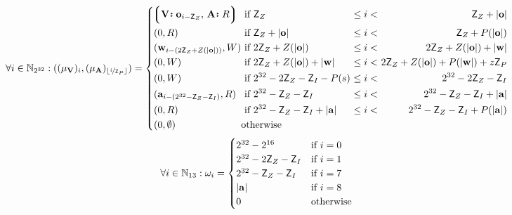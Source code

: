 \begin{equation}\label{eq:memlayout}
  \forall i \in \N_{2^{32}} : ((\mem_\mathbf{V})_i, (\mem_\mathbf{A})_{\floor{\nicefrac{i}{\mathsf{Z}_P}}}) = \left\{\begin{alignedat}{5}
    &\tup{\is{\mathbf{V}}{\mathbf{o}_{i - \mathsf{Z}_Z}}\ts\is{\mathbf{A}}{R}} &&\ \when
        \mathsf{Z}_Z
            &\ \leq i < \ &&
                \mathsf{Z}_Z + |\mathbf{o}|\\
    &(0, R) &&\ \when
        \mathsf{Z}_Z + |\mathbf{o}|
            &\ \leq i < \ &&
                \mathsf{Z}_Z + \rnp{|\mathbf{o}|} \\
    &(\mathbf{w}_{i - (2\mathsf{Z}_Z + \rnq{|\mathbf{o}|})}, W) &&\ \when
        2\mathsf{Z}_Z + \rnq{|\mathbf{o}|}
            &\ \leq i < \ &&
                2\mathsf{Z}_Z + \rnq{|\mathbf{o}|} + |\mathbf{w}|\\
    &(0, W) &&\ \when
        2\mathsf{Z}_Z + \rnq{|\mathbf{o}|} + |\mathbf{w}|
            &\ \leq i < \ &&
                2\mathsf{Z}_Z + \rnq{|\mathbf{o}|} + \rnp{|\mathbf{w}|} + z\mathsf{Z}_P\\
    &(0, W) &&\ \when
        2^{32} - 2\mathsf{Z}_Z - \mathsf{Z}_I - \rnp{s}
            &\ \leq i < \ &&
                2^{32} - 2\mathsf{Z}_Z - \mathsf{Z}_I\\
    &(\mathbf{a}_{i - (2^{32} - \mathsf{Z}_Z - \mathsf{Z}_I)}, R) &&\ \when
        2^{32} - \mathsf{Z}_Z - \mathsf{Z}_I
            &\ \leq i < \ &&
                2^{32} - \mathsf{Z}_Z - \mathsf{Z}_I + |\mathbf{a}|\\
    &(0, R) &&\ \when
        2^{32} - \mathsf{Z}_Z - \mathsf{Z}_I + |\mathbf{a}|
            &\ \leq i < \ &&
                2^{32} - \mathsf{Z}_Z - \mathsf{Z}_I + \rnp{|\mathbf{a}|}\\
    &(0, \none) &&\otherwise&&&
  \end{alignedat}\right.\\
\end{equation}
\begin{equation}\label{eq:registers}
  \forall i \in \mathbb{N}_{13} : \omega_i = \begin{cases}
      2^{32} - 2^{16} &\text{if } i = 0\\
      2^{32} - 2\mathsf{Z}_Z - \mathsf{Z}_I &\text{if } i = 1\\
      2^{32} - \mathsf{Z}_Z - \mathsf{Z}_I &\text{if } i = 7\\
      |\mathbf{a}|&\text{if } i = 8\\
      0 &\text{otherwise}
    \end{cases}
\end{equation}

